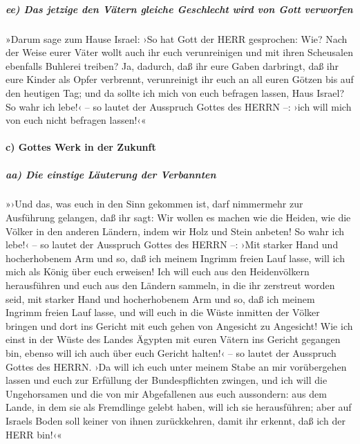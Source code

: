 \hypertarget{ee-das-jetzige-den-vuxe4tern-gleiche-geschlecht-wird-von-gott-verworfen}{%
\subparagraph{ee) Das jetzige den Vätern gleiche Geschlecht wird von
Gott
verworfen}\label{ee-das-jetzige-den-vuxe4tern-gleiche-geschlecht-wird-von-gott-verworfen}}

»Darum sage zum Hause Israel: ›So hat Gott der HERR
gesprochen: Wie? Nach der Weise eurer Väter wollt auch ihr euch
verunreinigen und mit ihren Scheusalen ebenfalls Buhlerei treiben?
Ja, dadurch, daß ihr eure Gaben darbringt, daß ihr eure
Kinder als Opfer verbrennt, verunreinigt ihr euch an all euren Götzen
bis auf den heutigen Tag; und da sollte ich mich von euch befragen
lassen, Haus Israel? So wahr ich lebe!‹ -- so lautet der Ausspruch
Gottes des HERRN --: ›ich will mich von euch nicht befragen lassen!‹«

\hypertarget{c-gottes-werk-in-der-zukunft}{%
\paragraph{c) Gottes Werk in der
Zukunft}\label{c-gottes-werk-in-der-zukunft}}

\hypertarget{aa-die-einstige-luxe4uterung-der-verbannten}{%
\subparagraph{aa) Die einstige Läuterung der
Verbannten}\label{aa-die-einstige-luxe4uterung-der-verbannten}}

»›Und das, was euch in den Sinn gekommen ist, darf
nimmermehr zur Ausführung gelangen, daß ihr sagt: Wir wollen es machen
wie die Heiden, wie die Völker in den anderen Ländern, indem wir Holz
und Stein anbeten! So wahr ich lebe!‹ -- so lautet der
Ausspruch Gottes des HERRN --: ›Mit starker Hand und hocherhobenem Arm
und so, daß ich meinem Ingrimm freien Lauf lasse, will ich mich als
König über euch erweisen! Ich will euch aus den
Heidenvölkern herausführen und euch aus den Ländern sammeln, in die ihr
zerstreut worden seid, mit starker Hand und hocherhobenem Arm und so,
daß ich meinem Ingrimm freien Lauf lasse, und will euch
in die Wüste inmitten der Völker bringen und dort ins Gericht mit euch
gehen von Angesicht zu Angesicht! Wie ich einst in der
Wüste des Landes Ägypten mit euren Vätern ins Gericht gegangen bin,
ebenso will ich auch über euch Gericht halten!‹ -- so lautet der
Ausspruch Gottes des HERRN. ›Da will ich euch unter
meinem Stabe an mir vorübergehen lassen und euch zur Erfüllung der
Bundespflichten zwingen, und ich will die Ungehorsamen
und die von mir Abgefallenen aus euch aussondern: aus dem Lande, in dem
sie als Fremdlinge gelebt haben, will ich sie herausführen; aber auf
Israels Boden soll keiner von ihnen zurückkehren, damit ihr erkennt, daß
ich der HERR bin!‹«

